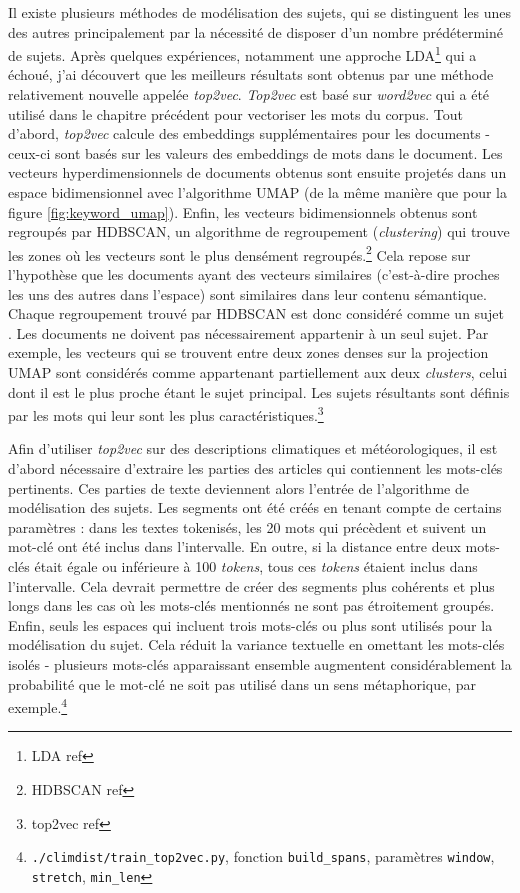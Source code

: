 \documentclass[a4paper,twoside,12pt]{article}
\begin{document}
Il existe plusieurs méthodes de modélisation des sujets, qui se distinguent les unes des autres principalement par la nécessité de disposer d'un nombre prédéterminé de sujets. Après quelques expériences, notamment une approche LDA\footnote{LDA ref} qui a échoué, j'ai découvert que les meilleurs résultats sont obtenus par une méthode relativement nouvelle appelée \textit{top2vec}. \textit{Top2vec} est basé sur \textit{word2vec} qui a été utilisé dans le chapitre précédent pour vectoriser les mots du corpus. Tout d'abord, \textit{top2vec} calcule des embeddings supplémentaires pour les documents - ceux-ci sont basés sur les valeurs des embeddings de mots dans le document. Les vecteurs hyperdimensionnels de documents obtenus sont ensuite projetés dans un espace bidimensionnel avec l'algorithme UMAP (de la même manière que pour la figure \ref{fig:keyword_umap}). Enfin, les vecteurs bidimensionnels obtenus sont regroupés par HDBSCAN, un algorithme de regroupement (\textit{clustering}) qui trouve les zones où les vecteurs sont le plus densément regroupés.\footnote{HDBSCAN ref} Cela repose sur l'hypothèse que les documents ayant des vecteurs similaires (c'est-à-dire proches les uns des autres dans l'espace) sont similaires dans leur contenu sémantique. Chaque regroupement trouvé par HDBSCAN est donc considéré comme un \og sujet \fg{}. Les documents ne doivent pas nécessairement appartenir à un seul sujet. Par exemple, les vecteurs qui se trouvent entre deux zones denses sur la projection UMAP sont considérés comme appartenant partiellement aux deux \textit{clusters}, celui dont il est le plus proche étant le sujet principal. Les sujets résultants sont définis par les mots qui leur sont les plus caractéristiques.\footnote{top2vec ref}

Afin d'utiliser \textit{top2vec} sur des descriptions climatiques et météorologiques, il est d'abord nécessaire d'extraire les parties des articles qui contiennent les mots-clés pertinents. Ces parties de texte deviennent alors l'entrée de l'algorithme de modélisation des sujets. Les segments ont été créés en tenant compte de certains paramètres : dans les textes tokenisés, les 20 mots qui précèdent et suivent un mot-clé ont été inclus dans l'intervalle. En outre, si la distance entre deux mots-clés était égale ou inférieure à 100 \textit{tokens}, tous ces \textit{tokens} étaient inclus dans l'intervalle. Cela devrait permettre de créer des segments plus cohérents et plus longs dans les cas où les mots-clés mentionnés ne sont pas étroitement groupés. Enfin, seuls les espaces qui incluent trois mots-clés ou plus sont utilisés pour la modélisation du sujet. Cela réduit la variance textuelle en omettant les mots-clés isolés - plusieurs mots-clés apparaissant ensemble augmentent considérablement la probabilité que le mot-clé ne soit pas utilisé dans un sens métaphorique, par exemple.\footnote{\texttt{./climdist/train\_top2vec.py}, fonction \texttt{build\_spans}, paramètres \texttt{window}, \texttt{stretch}, \texttt{min\_len}}
\end{document}
